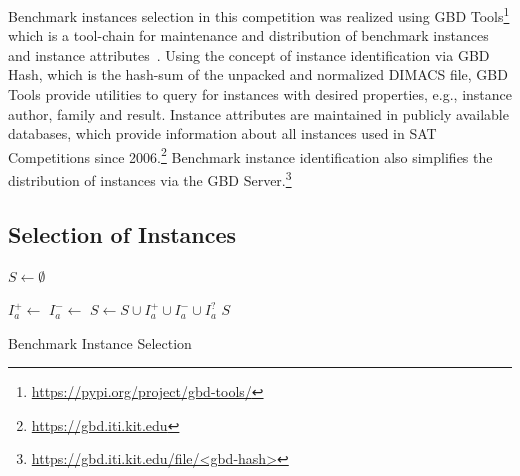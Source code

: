 \documentclass{elsarticle}
\begin{document}
Benchmark instances selection in this competition was realized using GBD Tools\footnote{\url{https://pypi.org/project/gbd-tools/}} which is a tool-chain for maintenance and distribution of benchmark instances and instance attributes~\cite{Iser:2018:GBD}.
Using the concept of instance identification via GBD Hash, which is the hash-sum of the unpacked and normalized DIMACS file, GBD Tools provide utilities to query for instances with desired properties, e.g., instance author, family and result.
Instance attributes are maintained in publicly available databases, which provide information about all instances used in SAT Competitions since 2006.\footnote{\url{https://gbd.iti.kit.edu}} 
Benchmark instance identification also simplifies the distribution of instances via the GBD Server.\footnote{\url{https://gbd.iti.kit.edu/file/<gbd-hash>}}


\subsection{Selection of Instances}
\label{sec:byob}

\begin{algorithm}[t]
\DontPrintSemicolon

\BlankLine
$S \leftarrow \emptyset$\;

 {
	$I_a^+ \leftarrow$ \;	
	$I_a^- \leftarrow$ \;	
	$S \leftarrow S \cup I_a^+ \cup I_a^- \cup I_a^?$\;	
}
\Return $S$\;

\caption{Benchmark Instance Selection}
\label{algo:select}
\end{algorithm}
\end{document}
